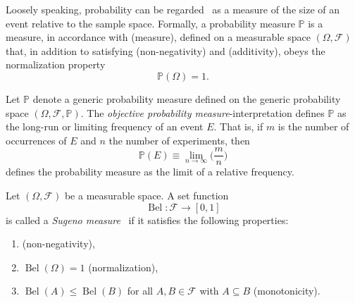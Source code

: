 \begin{definition}
	\label{def:probability}
	Loosely speaking, probability can be regarded~\cite{chan2021introduction} as a measure of the size of an event relative to the sample space. Formally, a probability measure $\mathbb{P}$ is a measure, in accordance with  (measure), defined on a measurable space $(\Omega, \mathcal{F})$ that, in addition to satisfying  (non-negativity) and  (additivity), obeys the normalization property
	\begin{equation}
		\mathbb{P}(\Omega) = 1.
	\end{equation}
\end{definition}




\begin{definition}
	\label{def:objective_probability}
	Let $\mathbb{P}$ denote a generic probability measure defined on the generic probability space $(\Omega,\mathcal{F},\mathbb{P})$. 
	The \emph{objective probability measure}-interpretation defines $\mathbb{P}$ as the long-run or limiting frequency of an event $E$. 
	That is, if $m$ is the number of occurrences of $E$ and $n$ the number of experiments, then~\cite{Leamer1978}
	\begin{equation}
		\mathbb{P}(E) \equiv \lim_{{n \to \infty}} \bigg(\frac{m}{n}\bigg)
	\end{equation}
	defines the probability measure as the limit of a relative frequency.
\end{definition}

\begin{definition}
	\label{def:sugeno_measure}
	Let $(\Omega, \mathcal{F})$ be a measurable space. 
	A set function
	\begin{equation}
		\operatorname{Bel}\colon \mathcal{F} \to [0,1]
	\end{equation}
	is called a \emph{Sugeno measure}~\cite{shafer1987} if it satisfies the following properties:
	\begin{enumerate}
		\item {} (non-negativity),
		\item $\operatorname{Bel}(\Omega) = 1$ (normalization),
		\item $\operatorname{Bel}(A) \le \operatorname{Bel}(B)$ for all $A, B \in \mathcal{F}$ with $A \subseteq B$ (monotonicity).
	\end{enumerate}
\end{definition}

